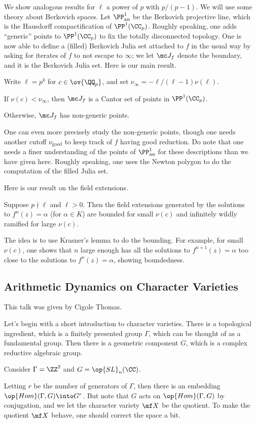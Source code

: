 \documentclass{article}
\begin{document}
We show analogous results for $\ell$ a power of $p$ with $p/(p-1)$. We will use some theory about Berkovich spaces. Let $\PP^1_{\mathrm{an}}$ be the Berkovich projective line, which is the Hausdorff compactification of $\PP^1(\CC_p)$. Roughly speaking, one adds ``generic'' points to $\PP^1(\CC_p)$ to fix the totally disconnected topology. One is now able to define a (filled) Berkovich Julia set attached to $f$ in the usual way by asking for iterates of $f$ to not escape to $\infty$; we let $\mc J_f$ denote the boundary, and it is the Berkovich Julia set. Here is our main result.
\begin{theorem}
	Write $\ell=p^k$ for $c\in\ov{\QQ_p}$, and set $\nu_\infty=-\ell/(\ell-1)\nu(\ell)$.
	\begin{listalph}
		\item If $\nu(c)<\nu_\infty$, then $\mc J_f$ is a Cantor set of points in $\PP^1(\CC_p)$.
		\item Otherwise, $\mc J_f$ has non-generic points.
	\end{listalph}
\end{theorem}
One can even more precisely study the non-generic points, though one needs another cutoff $\nu_{\mathrm{good}}$ to keep track of $f$ having good reduction. Do note that one needs a finer understanding of the points of $\PP^1_{\mathrm{an}}$ for these descriptions than we have given here. Roughly speaking, one uses the Newton polygon to do the computation of the filled Julia set.

Here is our result on the field extensions.
\begin{theorem}
	Suppose $p\nmid\ell$ and $\ell>0$. Then the field extensions generated by the solutions to $f^n(z)=\alpha$ (for $\alpha\in K$) are bounded for small $\nu(c)$ and infinitely wildly ramified for large $\nu(c)$.
\end{theorem}
The idea is to use Krasner's lemma to do the bounding. For example, for small $\nu(c)$, one shows that $n$ large enough has all the solutions to $f^{n+1}(z)=\alpha$ too close to the solutions to $f^n(z)=\alpha$, showing boundedness.

\subsection{Arithmetic Dynamics on Character Varieties}
This talk was given by Cigole Thomas.

Let's begin with a short introduction to character varieties. There is a topological ingredient, which is a finitely presented group $\Gamma$, which can be thought of as a fundamental group. Then there is a geometric component $G$, which is a complex reductive algebraic group.
\begin{example}
	Consider $\Gamma=\ZZ^2$ and $G=\op{SL}_n(\CC)$.
\end{example}
Letting $r$ be the number of generators of $\Gamma$, then there is an embedding $\op{Hom}(\Gamma,G)\into G^r$. But note that $G$ acts on $\op{Hom}(\Gamma,G)$ by conjugation, and we let the character variety $\mf X$ be the quotient. To make the quotient $\mf X$ behave, one should correct the space a bit.
\end{document}
